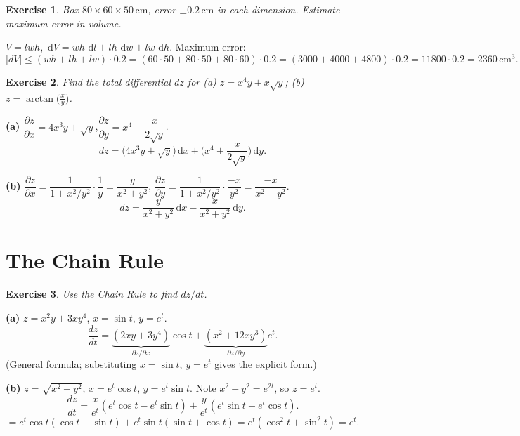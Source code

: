 \documentclass[12pt,a4paper]{article}
\theoremstyle{exstyle}
\newtheorem{exercise}{Exercise}[section]
\newcommand{\dd}{\,\mathrm{d}}
\newcommand{\pd}[2]{\dfrac{\partial #1}{\partial #2}}
\newcommand{\dif}[1]{\,\mathrm{d}#1}
\begin{document}
\begin{exercise}
Box $80\times60\times50\,\text{cm}$, error $\pm0.2\,\text{cm}$ in each dimension.
Estimate maximum error in volume.
\end{exercise}
\begin{solbox}
$V=lwh$, $\dd V=wh\,\dd l+lh\,\dd w+lw\,\dd h$.
Maximum error:
\[
  |dV|\le(wh+lh+lw)\cdot 0.2=(60\cdot50+80\cdot50+80\cdot60)\cdot0.2
  =(3000+4000+4800)\cdot0.2=11800\cdot0.2=\boxed{2360\,\text{cm}^3}.
\]
\end{solbox}

\begin{exercise}
Find the total differential $dz$ for (a) $z=x^4y+x\sqrt{y}$;
(b) $z=\arctan\!\bigl(\tfrac{x}{y}\bigr)$.
\end{exercise}
\begin{solbox}
\textbf{(a)}
$\pd{z}{x}=4x^3y+\sqrt{y}$,\quad $\pd{z}{y}=x^4+\dfrac{x}{2\sqrt{y}}$.
\[
  dz=\bigl(4x^3y+\sqrt{y}\bigr)\dif{x}+\biggl(x^4+\frac{x}{2\sqrt{y}}\biggr)\dif{y}.
\]

\textbf{(b)} $\pd{z}{x}=\dfrac{1}{1+x^2/y^2}\cdot\dfrac{1}{y}=\dfrac{y}{x^2+y^2}$,\quad
$\pd{z}{y}=\dfrac{1}{1+x^2/y^2}\cdot\dfrac{-x}{y^2}=\dfrac{-x}{x^2+y^2}$.
\[
  dz=\frac{y}{x^2+y^2}\dif{x}-\frac{x}{x^2+y^2}\dif{y}.
\]
\end{solbox}

\section{The Chain Rule}

\begin{exercise}
Use the Chain Rule to find $dz/dt$.
\end{exercise}
\begin{solbox}
\textbf{(a)} $z=x^2y+3xy^4$, $x=\sin t$, $y=e^t$.
\[
  \frac{dz}{dt}=\underbrace{(2xy+3y^4)}_{\partial z/\partial x}\cos t
               +\underbrace{(x^2+12xy^3)}_{\partial z/\partial y}e^t.
\]
(General formula; substituting $x=\sin t$, $y=e^t$ gives the explicit form.)

\textbf{(b)} $z=\sqrt{x^2+y^2}$, $x=e^t\cos t$, $y=e^t\sin t$.
Note $x^2+y^2=e^{2t}$, so $z=e^t$.
\[
  \frac{dz}{dt}=\frac{x}{e^t}(e^t\cos t-e^t\sin t)+\frac{y}{e^t}(e^t\sin t+e^t\cos t).
\]
\[
  =e^t\cos t(\cos t-\sin t)+e^t\sin t(\sin t+\cos t)=e^t(\cos^2\!t+\sin^2\!t)=\boxed{e^t}.
\]
\end{solbox}
\end{document}
